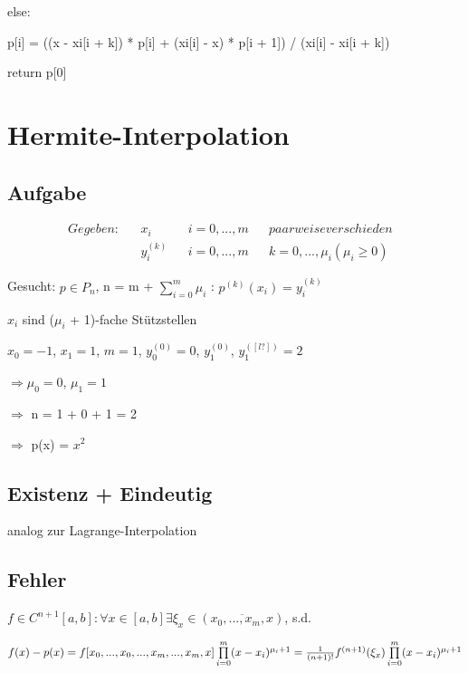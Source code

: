 \documentclass[12pt,a4paper]{article} %
\newcommand*\tab[1][1cm]{\hspace*{#1}}
\begin{document}
	\tab \tab else:
	
	\tab \tab \tab p[i] = ((x - xi[i + k]) * p[i] + (xi[i] - x) * p[i + 1]) / (xi[i] - xi[i + k])
	
	return p[0]	
	
	\newpage
	
	\section{Hermite-Interpolation}
	
	\subsection{Aufgabe}
	
	\begin{align*}
		Gegeben: && x_i && i = 0, ..., m && paarweise verschieden & \\
		&& y_i^{(k)} && i = 0, ..., m && k = 0, ..., \mu_i (\mu_i \ge 0)
	\end{align*}
	
	Gesucht: $p \in P_n$, n = m + $\sum\limits_{i = 0}^{m}\mu_i$ : $p^{(k)}(x_i) = y_i^{(k)}$
	
	$x_i$ sind ($\mu_i$ + 1)-fache Stützstellen
	
	$x_0 = -1$, $x_1 = 1$, $m = 1$, $y_0^{(0)} = 0$, $y_1^{(0)}$, $y_1^{([l?])} = 2$
	
	$\Rightarrow \mu_0 = 0$, $\mu_1 = 1$
	
	$\Rightarrow$ n = 1 + 0 + 1 = 2
	
	$\Rightarrow$ p(x) = $x^2$
	
	\subsection{Existenz + Eindeutig}
	
	analog zur Lagrange-Interpolation
	
	\subsection{Fehler}
	
	$f \in C^{n + 1}[a, b]: \forall x \in [a, b] \exists \xi_x \in (\overline{x_0, ..., x_m, x})$, s.d.
	
	$f(x) - p(x) = f[x_0, ..., x_0, ..., x_m, ..., x_m, x]\prod\limits_{i = 0}^{m}(x - x_i)^{\mu_i + 1} \\
	 = \frac{1}{(n + 1)!}f^{(n + 1)}(\xi_x)\prod\limits_{i = 0}^{m}(x - x_i)^{\mu_i + 1}$
	
\end{document}
